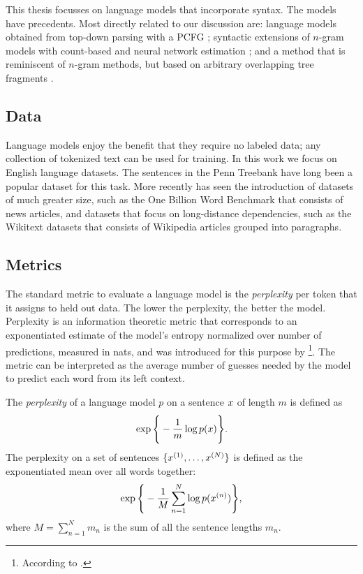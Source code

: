     This thesis focusses on language models that incorporate syntax. The models have precedents. Most directly related to our discussion are: language models obtained from top-down parsing with a PCFG \citep{roark2001probabilistic}; syntactic extensions of $n$-gram models with count-based and neural network estimation \citep{chelba2000structured,emami2005neural}; and a method that is reminiscent of $n$-gram methods, but based on arbitrary overlapping tree fragments \citep{pauls2012treelets}.

  \subsection{Data}
    Language models enjoy the benefit that they require no labeled data; any collection of tokenized text can be used for training. In this work we focus on English language datasets. The sentences in the Penn Treebank have long been a popular dataset for this task. More recently has seen the introduction of datasets of much greater size, such as the One Billion Word Benchmark \citep{chelba2013one} that consists of news articles, and datasets that focus on long-distance dependencies, such as the Wikitext datasets \citep{merity2016pointer} that consists of Wikipedia articles grouped into paragraphs.

  \subsection{Metrics}
    The standard metric to evaluate a language model is the \textit{perplexity} per token that it assigns to held out data. The lower the perplexity, the better the model. Perplexity is an information theoretic metric that corresponds to an exponentiated estimate of the model's entropy normalized over number of predictions, measured in nats, and was introduced for this purpose by \citet{jelinek1997information}\footnote{According to \citep{chelba2017n}.}. The metric can be interpreted as the average number of guesses needed by the model to predict each word from its left context.

    \begin{definition}{} The \textit{perplexity} of a language model $p$ on a sentence $x$ of length $m$ is defined as
    \begin{align*}
      \exp \Bigg\{ - \frac{1}{m} \log p( x ) \Bigg\}.
    \end{align*}
    The perplexity on a set of sentences $\{ x^{(1)}, \dots, x^{(N)} \}$ is defined as the exponentiated mean over all words together:
    \begin{align*}
      \exp \Bigg\{ - \frac{1}{M} \sum_{n=1}^N \log p( x^{(n)} ) \Bigg\},
    \end{align*}
    where $M = \sum_{n=1}^N m_n$ is the sum of all the sentence lengths $m_n$.
    \end{definition}


